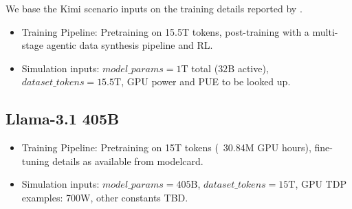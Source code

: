 We base the Kimi scenario inputs on the training details reported by
\textcite{kimi_team_kimi_2025}.

\begin{itemize}
  \item Training Pipeline: Pretraining on 15.5T tokens, post-training with a multi-stage agentic data synthesis pipeline and RL.
  \item Simulation inputs: $\mathit{model\_params}=1\mathrm{T}$ total ($32\mathrm{B}$ active), $\mathit{dataset\_tokens}=15.5\mathrm{T}$, GPU power and PUE to be looked up.
\end{itemize}

\subsection{Llama-3.1 405B}

\begin{itemize}
  \item Training Pipeline: Pretraining on 15T tokens (~30.84M GPU hours), fine-tuning details as available from modelcard.
  \item Simulation inputs: $\mathit{model\_params}=405\mathrm{B}$, $\mathit{dataset\_tokens}=15\mathrm{T}$, GPU TDP examples: 700W, other constants TBD.
\end{itemize}

